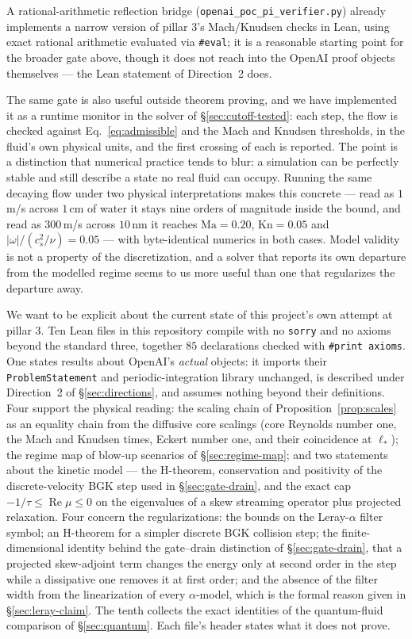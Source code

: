 \documentclass[11pt,a4paper]{article}
\begin{document}
A rational-arithmetic reflection bridge (\texttt{openai\_poc\_pi\_verifier.py}) already implements a
narrow version of pillar 3's Mach/Knudsen checks in Lean, using exact rational arithmetic evaluated
via \texttt{\#eval}; it is a reasonable starting point for the broader gate above, though it does
not reach into the OpenAI proof objects themselves --- the Lean statement of Direction~2 does.

The same gate is also useful outside theorem proving, and we have implemented it as a runtime
monitor in the solver of \S\ref{sec:cutoff-tested}: each step, the flow is checked against
Eq.~\eqref{eq:admissible} and the Mach and Knudsen thresholds, in the fluid's own physical units,
and the first crossing of each is reported. The point is a distinction that numerical practice
tends to blur: a simulation can be perfectly stable and still describe a state no real fluid can
occupy. Running the same decaying flow under two physical interpretations makes this concrete ---
read as $1$\,m/s across $1$\,cm of water it stays nine orders of magnitude inside the bound, and
read as $300$\,m/s across $10$\,nm it reaches $\mathrm{Ma}=0.20$, $\mathrm{Kn}=0.05$ and
$|\omega|/(c_s^2/\nu)=0.05$ --- with byte-identical numerics in both cases. Model validity is not a
property of the discretization, and a solver that reports its own departure from the modelled
regime seems to us more useful than one that regularizes the departure away.

We want to be explicit about the current state of this project's own attempt at pillar 3. Ten
Lean files in this repository compile with no \texttt{sorry} and no axioms beyond the standard
three, together $85$ declarations checked with \texttt{\#print axioms}. One states results about
OpenAI's \emph{actual} objects: it imports their \texttt{ProblemStatement} and periodic-integration
library unchanged, is described under Direction~2 of \S\ref{sec:directions}, and assumes nothing
beyond their definitions. Four support the physical reading: the scaling chain of
Proposition~\ref{prop:scales} as an equality chain from the diffusive core scalings (core Reynolds
number one, the Mach and Knudsen times, Eckert number one, and their coincidence at $\ell_*$); the
regime map of blow-up scenarios of \S\ref{sec:regime-map}; and two statements about the kinetic model
--- the H-theorem, conservation and positivity of the discrete-velocity BGK step used in
\S\ref{sec:gate-drain}, and the exact cap $-1/\tau\le\operatorname{Re}\mu\le0$ on the eigenvalues of a
skew streaming operator plus projected relaxation. Four concern the regularizations: the bounds on
the Leray-$\alpha$ filter symbol; an H-theorem for a simpler discrete BGK collision step; the
finite-dimensional identity behind the gate--drain distinction of \S\ref{sec:gate-drain}, that a
projected skew-adjoint term changes the energy only at second order in the step while a dissipative
one removes it at first order; and the absence of the filter width from the linearization of every
$\alpha$-model, which is the formal reason given in \S\ref{sec:leray-claim}. The tenth collects the exact
identities of the quantum-fluid comparison of \S\ref{sec:quantum}. Each file's header states
what it does not prove.
\end{document}
